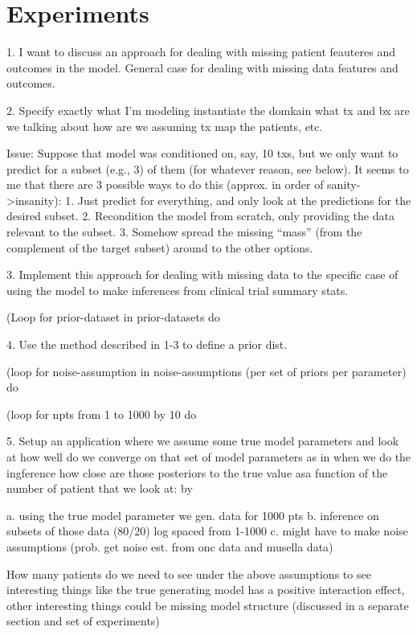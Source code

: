 \documentclass[twocolumn]{bmcart}%
\begin{document}
\section{Experiments}

1. I want to discuss an approach for dealing with missing patient
feauteres and outcomes in the model. General case for dealing with
missing data features and outcomes.

2. Specify exactly what I'm modeling instantiate the domkain what tx
and bx are we talking about how are we assuming tx map the patients,
etc.

Issue: Suppose that model was conditioned on, say, 10 txs, but we only
want to predict for a subset (e.g., 3) of them (for whatever reason,
see below). It seems to me that there are 3 possible ways to do this
(approx. in order of sanity->insanity): 1. Just predict for
everything, and only look at the predictions for the desired
subset. 2. Recondition the model from scratch, only providing the data
relevant to the subset. 3. Somehow spread the missing ``mass'' (from
the complement of the target subset) around to the other options.

3. Implement this approach for dealing with missing data to the
specific case of using the model to make inferences from clinical
trial summary stats.

(Loop for prior-dataset in prior-datasets
  do

4. Use the method described in 1-3 to define a prior dist. 

   (loop for noise-assumption in noise-assumptions (per set of priors per parameter)
      do

     (loop for npts from 1 to 1000 by 10
        do

5. Setup an application where we assume some true model parameters and
look at how well do we converge on that set of model parameters as in
when we do the ingference how close are those posteriors to the true
value asa function of the number of patient that we look at: by

a. using the true model parameter we gen. data for 1000 pts
b. inference on subsets of those data (80/20) log spaced from 1-1000
c. might have to make noise assumptions (prob. get noise est. from onc data and musella data)

How many patients do we need to see under the above assumptions to see
interesting things like the true generating model has a positive
interaction effect, other interesting things could be missing model
structure (discussed in a separate section and set of experiments)
\end{document}
